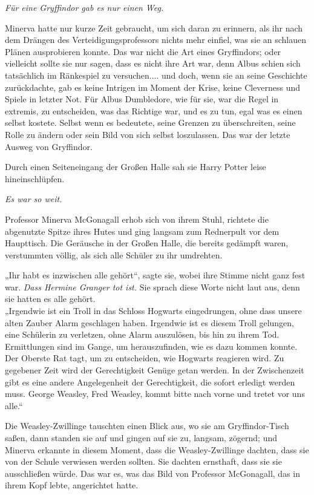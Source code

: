 {\emph{Für eine Gryffindor gab es nur einen Weg.}

Minerva hatte nur kurze Zeit gebraucht, um sich daran zu erinnern, als ihr nach dem Drängen des Verteidigungsprofessors nichts mehr einfiel, was sie an schlauen Plänen ausprobieren konnte. Das war nicht die Art eines Gryffindors; oder vielleicht sollte sie nur sagen, dass es nicht ihre Art war, denn Albus schien sich tatsächlich im Ränkespiel zu versuchen.... und doch, wenn sie an seine Geschichte zurückdachte, gab es keine Intrigen im Moment der Krise, keine Cleverness und Spiele in letzter Not. Für Albus Dumbledore, wie für sie, war die Regel in extremis, zu entscheiden, was das Richtige war, und es zu tun, egal was es einen selbst kostete. Selbst wenn es bedeutete, seine Grenzen zu überschreiten, seine Rolle zu ändern oder sein Bild von sich selbst loszulassen. Das war der letzte Ausweg von Gryffindor.

Durch einen Seiteneingang der Großen Halle sah sie Harry Potter leise hineinschlüpfen.

\emph{Es war so weit.}

Professor Minerva McGonagall erhob sich von ihrem Stuhl, richtete die abgenutzte Spitze ihres Hutes und ging langsam zum Rednerpult vor dem Haupttisch. Die Geräusche in der Großen Halle, die bereits gedämpft waren, verstummten völlig, als sich alle Schüler zu ihr umdrehten.

„Ihr habt es inzwischen alle gehört“, sagte sie, wobei ihre Stimme nicht ganz fest war. \emph{Dass Hermine Granger tot ist.} Sie sprach diese Worte nicht laut aus, denn sie hatten es alle gehört.\\ „Irgendwie ist ein Troll in das Schloss Hogwarts eingedrungen, ohne dass unsere alten Zauber Alarm geschlagen haben. Irgendwie ist es diesem Troll gelungen, eine Schülerin zu verletzen, ohne Alarm auszulösen, bis hin zu ihrem Tod. Ermittlungen sind im Gange, um herauszufinden, wie es dazu kommen konnte. Der Oberste Rat tagt, um zu entscheiden, wie Hogwarts reagieren wird. Zu gegebener Zeit wird der Gerechtigkeit Genüge getan werden. In der Zwischenzeit gibt es eine andere Angelegenheit der Gerechtigkeit, die sofort erledigt werden muss. George Weasley, Fred Weasley, kommt bitte nach vorne und tretet vor uns alle.“

Die Weasley-Zwillinge tauschten einen Blick aus, wo sie am Gryffindor-Tisch saßen, dann standen sie auf und gingen auf sie zu, langsam, zögernd; und Minerva erkannte in diesem Moment, dass die Weasley-Zwillinge dachten, dass sie von der Schule verwiesen werden sollten. Sie dachten ernsthaft, dass sie sie ausschließen würde. Das war es, was das Bild von Professor McGonagall, das in ihrem Kopf lebte, angerichtet hatte.

}
